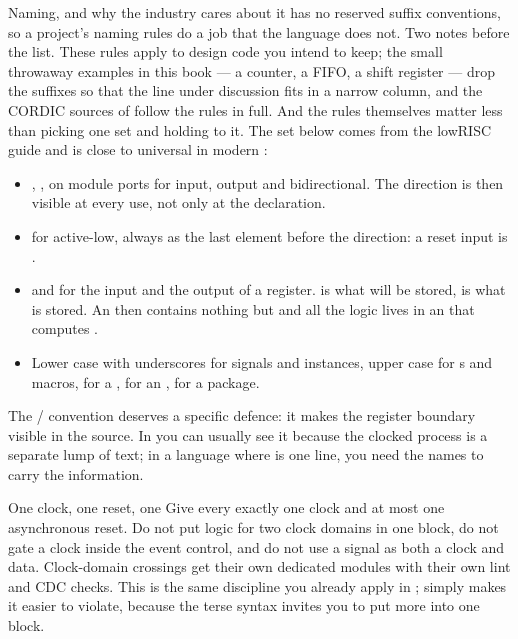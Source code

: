\begin{tipbox}{Naming, and why the industry cares about it}
\SV{} has no reserved suffix conventions, so a project's naming rules do a job
that the language does not. Two notes before the list. These rules apply to
design code you intend to keep; the small throwaway examples in this book ---
a counter, a FIFO, a shift register --- drop the suffixes so that the line
under discussion fits in a narrow column, and the CORDIC sources of
 follow the rules in full. And the rules themselves matter less
than picking one set and holding to it. The set below comes from the lowRISC guide and is
close to universal in modern \SV{}:

\begin{itemize}
\item {}, ,  on module ports for input, output and
  bidirectional. The direction is then visible at every use, not only at the
  declaration.
\item {} for active-low, always as the last element before the
  direction: a reset input is .
\item {} and  for the input and the output of a register.
   is what will be stored,  is what is stored. An
   then contains nothing but  and all
  the logic lives in an  that computes .
\item Lower case with underscores for signals and instances, upper case for
  s and macros,  for a ,  for
  an ,  for a package.
\end{itemize}

The / convention deserves a specific defence: it makes the
register boundary visible in the source. In \VHDL{} you can usually see it
because the clocked process is a separate lump of text; in a language where
 is one line, you need the names to
carry the information.
\end{tipbox}

\begin{tipbox}{One clock, one reset, one }
Give every  exactly one clock and at most one asynchronous
reset. Do not put logic for two clock domains in one block, do not gate a clock
inside the event control, and do not use a signal as both a clock and data.
Clock-domain crossings get their own dedicated modules with their own lint and
CDC checks. This is the same discipline you already apply in \VHDL{}; \SV{}
simply makes it easier to violate, because the terse syntax invites you to put
more into one block.
\end{tipbox}

